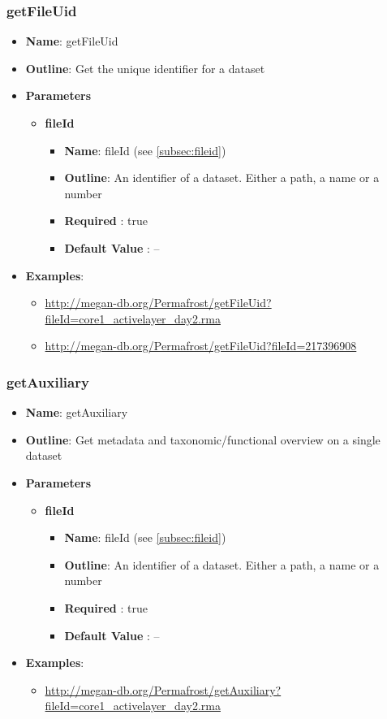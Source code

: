 \documentclass[11pt]{article}
\begin{document}
\subsubsection{getFileUid}

\begin{itemize}
	\item \textbf{Name}: getFileUid
	\item \textbf{Outline}: Get the unique identifier for a dataset
	\item \textbf{Parameters}
		\begin{itemize}
			\item \textbf{fileId}
				\begin{itemize}
					\item \textbf{Name}: fileId (see \ref{subsec:fileid})
					\item \textbf{Outline}: An identifier of a dataset. Either a path, a name or a number
					\item \textbf{Required} : true
					\item \textbf{Default Value} : --
				\end{itemize}
		\end{itemize}
	\item \textbf{Examples}:
		\begin{itemize}
			\item \url{http://megan-db.org/Permafrost/getFileUid?fileId=core1_activelayer_day2.rma}
			\item \url{http://megan-db.org/Permafrost/getFileUid?fileId=217396908}
		\end{itemize}
\end{itemize}

\subsubsection{getAuxiliary}

\begin{itemize}
	\item \textbf{Name}: getAuxiliary
	\item \textbf{Outline}: Get metadata and taxonomic/functional overview on a single dataset
	\item \textbf{Parameters}
		\begin{itemize}
			\item \textbf{fileId}
				\begin{itemize}
					\item \textbf{Name}: fileId (see \ref{subsec:fileid})
					\item \textbf{Outline}: An identifier of a dataset. Either a path, a name or a number
					\item \textbf{Required} : true
					\item \textbf{Default Value} : --
				\end{itemize}
		\end{itemize}
	\item \textbf{Examples}:
		\begin{itemize}
			\item \url{http://megan-db.org/Permafrost/getAuxiliary?fileId=core1_activelayer_day2.rma}
		\end{itemize}
\end{itemize}
\end{document}

